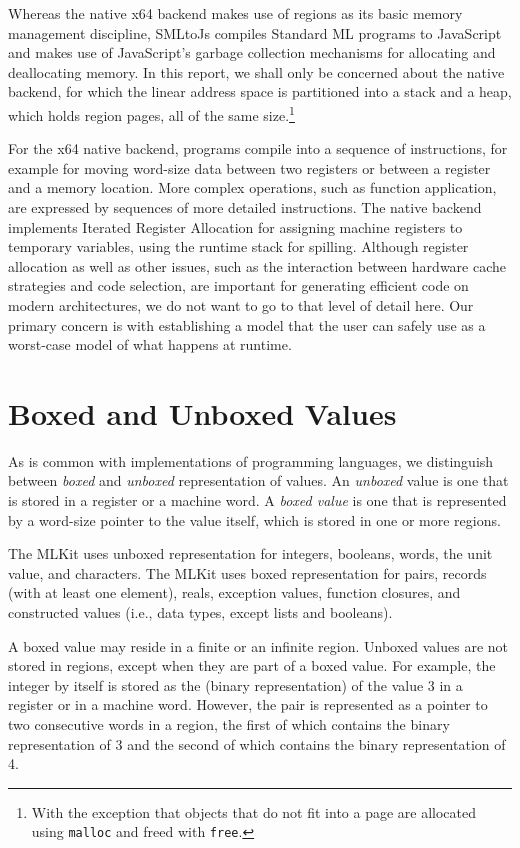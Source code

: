 \documentclass[12pt]{book}
\begin{document}
Whereas the native x64 backend makes use of regions as its basic
memory management discipline, SMLtoJs compiles Standard ML programs to
JavaScript and makes use of JavaScript's garbage collection mechanisms
for allocating and deallocating memory. In this report, we shall only
be concerned about the native backend, for which the linear address
space is partitioned into a stack and a heap, which holds region
pages, all of the same size.\footnote{With the exception that objects
  that do not fit into a page are allocated using \texttt{malloc} and
  freed with \texttt{free}.}

For the x64 native backend, programs compile into a sequence of
instructions, for example for moving word-size data between two
registers or between a register and a memory location.  More complex
operations, such as function application, are expressed by sequences
of more detailed instructions. The native backend implements Iterated
Register Allocation \cite{appel96} for assigning machine registers to
temporary variables, using the runtime stack for spilling.  Although
register allocation as well as other issues, such as the interaction
between hardware cache strategies and code selection, are important
for generating efficient code on modern architectures, we do not
want to go to that level of detail here. Our primary concern is with
establishing a model that the user can safely use as a worst-case
model of what happens at runtime.

\section{Boxed and Unboxed Values}
\label{boxing.sec}
%
%
%
As is common with implementations of programming languages, we
distinguish between {\em boxed\/} and {\em unboxed\/} representation
of values.  An {\em unboxed\/} value is one that is stored in a
register or a machine word. A {\em boxed value\/} is one that is
represented by a word-size pointer to the value itself, which is
stored in one or more regions.

The MLKit uses unboxed representation for integers, booleans, words, the
unit value, and characters.  The MLKit uses boxed representation for
pairs, records (with at least one element), reals, exception values,
function closures, and constructed values (i.e., data types, except
lists and booleans).

A boxed value may reside in a finite or an infinite region.  Unboxed
values are not stored in regions, except when they are part of a boxed
value. For example, the integer  by itself is stored as the
(binary representation) of the value 3 in a register or in a machine
word. However, the pair  is represented as a pointer to
two consecutive words in a region, the first of which contains the
binary representation of 3 and the second of which contains the binary
representation of 4.
\end{document}
